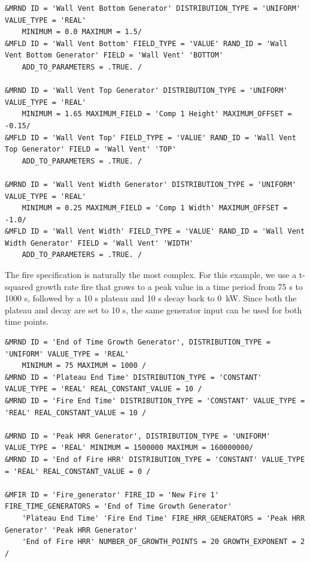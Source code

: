 \documentclass[12pt,twoside]{book}
\begin{document}
\vspace{\baselineskip}
\begin{lstlisting}
&MRND ID = 'Wall Vent Bottom Generator' DISTRIBUTION_TYPE = 'UNIFORM' VALUE_TYPE = 'REAL'
    MINIMUM = 0.0 MAXIMUM = 1.5/
&MFLD ID = 'Wall Vent Bottom' FIELD_TYPE = 'VALUE' RAND_ID = 'Wall Vent Bottom Generator' FIELD = 'Wall Vent' 'BOTTOM'
    ADD_TO_PARAMETERS = .TRUE. /

&MRND ID = 'Wall Vent Top Generator' DISTRIBUTION_TYPE = 'UNIFORM' VALUE_TYPE = 'REAL'
    MINIMUM = 1.65 MAXIMUM_FIELD = 'Comp 1 Height' MAXIMUM_OFFSET = -0.15/
&MFLD ID = 'Wall Vent Top' FIELD_TYPE = 'VALUE' RAND_ID = 'Wall Vent Top Generator' FIELD = 'Wall Vent' 'TOP'
    ADD_TO_PARAMETERS = .TRUE. /

&MRND ID = 'Wall Vent Width Generator' DISTRIBUTION_TYPE = 'UNIFORM' VALUE_TYPE = 'REAL'
    MINIMUM = 0.25 MAXIMUM_FIELD = 'Comp 1 Width' MAXIMUM_OFFSET = -1.0/
&MFLD ID = 'Wall Vent Width' FIELD_TYPE = 'VALUE' RAND_ID = 'Wall Vent Width Generator' FIELD = 'Wall Vent' 'WIDTH'
    ADD_TO_PARAMETERS = .TRUE. /
\end{lstlisting}

The fire specification is naturally the most complex. For this example, we use a t-squared growth rate fire that grows to a peak value in a time period from 75 s to 1000 s, followed by a 10 s plateau and 10 s decay back to 0~kW. Since both the plateau and decay are set to 10 s, the same generator input can be used for both time points.
\vspace{\baselineskip}
\begin{lstlisting}
&MRND ID = 'End of Time Growth Generator', DISTRIBUTION_TYPE = 'UNIFORM' VALUE_TYPE = 'REAL'
    MINIMUM = 75 MAXIMUM = 1000 /
&MRND ID = 'Plateau End Time' DISTRIBUTION_TYPE = 'CONSTANT' VALUE_TYPE = 'REAL' REAL_CONSTANT_VALUE = 10 /
&MRND ID = 'Fire End Time' DISTRIBUTION_TYPE = 'CONSTANT' VALUE_TYPE = 'REAL' REAL_CONSTANT_VALUE = 10 /

&MRND ID = 'Peak HRR Generator', DISTRIBUTION_TYPE = 'UNIFORM' VALUE_TYPE = 'REAL' MINIMUM = 1500000 MAXIMUM = 160000000/
&MRND ID = 'End of Fire HRR' DISTRIBUTION_TYPE = 'CONSTANT' VALUE_TYPE = 'REAL' REAL_CONSTANT_VALUE = 0 /

&MFIR ID = 'Fire_generator' FIRE_ID = 'New Fire 1' FIRE_TIME_GENERATORS = 'End of Time Growth Generator'
    'Plateau End Time' 'Fire End Time' FIRE_HRR_GENERATORS = 'Peak HRR Generator' 'Peak HRR Generator'
    'End of Fire HRR' NUMBER_OF_GROWTH_POINTS = 20 GROWTH_EXPONENT = 2 /
\end{lstlisting}
\end{document}
